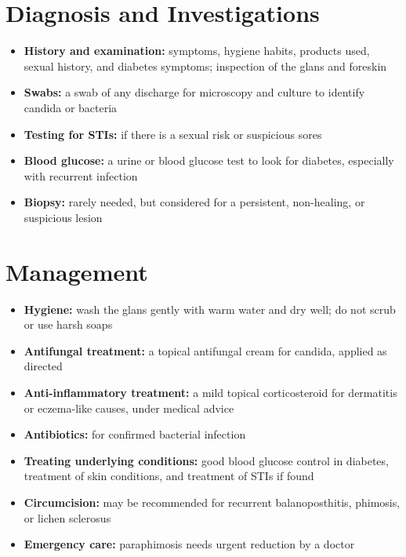 \section*{Diagnosis and Investigations}
\begin{itemize}
    \item \textbf{History and examination:} symptoms, hygiene habits, products used, sexual history, and diabetes symptoms; inspection of the glans and foreskin
    \item \textbf{Swabs:} a swab of any discharge for microscopy and culture to identify candida or bacteria
    \item \textbf{Testing for STIs:} if there is a sexual risk or suspicious sores
    \item \textbf{Blood glucose:} a urine or blood glucose test to look for diabetes, especially with recurrent infection
    \item \textbf{Biopsy:} rarely needed, but considered for a persistent, non-healing, or suspicious lesion
\end{itemize}

\section*{Management}
\begin{itemize}
    \item \textbf{Hygiene:} wash the glans gently with warm water and dry well; do not scrub or use harsh soaps
    \item \textbf{Antifungal treatment:} a topical antifungal cream for candida, applied as directed
    \item \textbf{Anti-inflammatory treatment:} a mild topical corticosteroid for dermatitis or eczema-like causes, under medical advice
    \item \textbf{Antibiotics:} for confirmed bacterial infection
    \item \textbf{Treating underlying conditions:} good blood glucose control in diabetes, treatment of skin conditions, and treatment of STIs if found
    \item \textbf{Circumcision:} may be recommended for recurrent balanoposthitis, phimosis, or lichen sclerosus
    \item \textbf{Emergency care:} paraphimosis needs urgent reduction by a doctor
\end{itemize}

